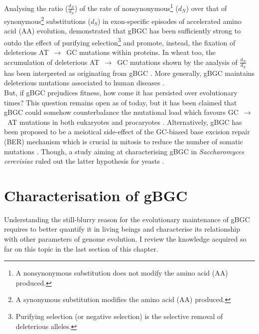 Analysing the ratio ($\frac{d_N}{d_S}$) of the rate of nonsynonymous\footnote{A nonsynonymous substitution does not modify the amino acid (AA) produced.} ($d_N$) over that of synonymous\footnote{A synonymous substitution modifies the amino acid (AA) produced.} substitutions ($d_S$) in exon-specific episodes of accelerated amino acid (AA) evolution, \citet{galtier2009gcbiased} demonstrated that gBGC has been sufficiently strong to outdo the effect of purifying selection\footnote{Purifying selection (or negative selection) is the selective removal of deleterious alleles.} and promote, instead, the fixation of deleterious AT~$\rightarrow$~GC mutations within proteins.
In wheat too, the accumulation of deleterious AT~$\rightarrow$~GC mutations shown by the analysis of $\frac{d_N}{d_S}$ has been interpreted as originating from gBGC \citep{haudry2008mating}.
More generally, gBGC maintains deleterious mutations associated to human diseases \citep{necsulea2011meiotic,capra2013modelbased,lachance2014biased,xue2016basebiased}.\\


But, if gBGC prejudices fitness, how come it has persisted over evolutionary times?
This question remains open as of today, but it has been claimed that gBGC could somehow counterbalance the mutational load \citep{bengtsson1986biased,marais2003biased,glemin2010surprising,arbeithuber2015crossovers} which favours GC~$\rightarrow$~AT mutations in both eukaryotes \citep{lynch2010rate} and procaryotes \citep{hershberg2009general}.
Alternatively, gBGC has been proposed to be a meiotical side-effect of the GC-biased base excision repair (BER) mechanism which is crucial in mitosis to reduce the number of somatic mutations \citep{marais2003sex,lesecque2014conversion}.
Though, a study aiming at characterising gBGC in \textit{Saccharomyces cerevisiae} ruled out the latter hypothesis for yeasts \citep{lesecque2014conversion}.








\section{Characterisation of gBGC}

Understanding the still-blurry reason for the evolutionary maintenance of gBGC requires to better quantify it in living beings and characterise its relationship with other parameters of genome evolution. 
I review the knowledge acquired so far on this topic in the last section of this chapter.



